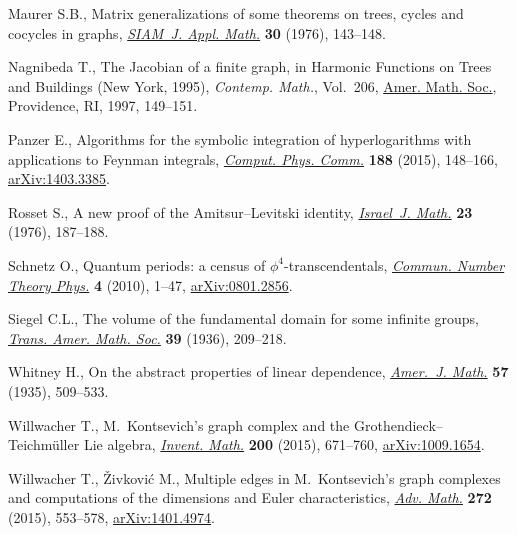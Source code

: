 \documentclass[pdftex]{sigma}%
\numberwithin{equation}{section}
\newcommand{\0}{\color{blue}{\mathsf{0}}}
\begin{document}
\begin{thebibliography}{99}
Maurer S.B., Matrix generalizations of some theorems on trees, cycles and
 cocycles in graphs, \href{https://doi.org/10.1137/0130017}{\textit{SIAM~J. Appl. Math.}} \textbf{30} (1976),
 143--148.

Nagnibeda T., The {J}acobian of a finite graph, in Harmonic Functions on Trees
 and Buildings ({N}ew {Y}ork, 1995), \textit{Contemp. Math.}, Vol.~206, \href{https://doi.org/10.1090/conm/206/02698}{Amer.
 Math. Soc.}, Providence, RI, 1997, 149--151.

Panzer E., Algorithms for the symbolic integration of hyperlogarithms with
 applications to {F}eynman integrals, \href{https://doi.org/10.1016/j.cpc.2014.10.019}{\textit{Comput. Phys. Comm.}}
 \textbf{188} (2015), 148--166, \href{https://arxiv.org/abs/1403.3385}{arXiv:1403.3385}.

Rosset S., A new proof of the {A}mitsur--{L}evitski identity, \href{https://doi.org/10.1007/BF02756797}{\textit{Israel~J.
 Math.}} \textbf{23} (1976), 187--188.

Schnetz O., Quantum periods: a census of {$\phi^4$}-transcendentals,
 \href{https://doi.org/10.4310/CNTP.2010.v4.n1.a1}{\textit{Commun. Number Theory Phys.}} \textbf{4} (2010), 1--47,
 \href{https://arxiv.org/abs/0801.2856}{arXiv:0801.2856}.

Siegel C.L., The volume of the fundamental domain for some infinite groups,
 \href{https://doi.org/10.2307/1989745}{\textit{Trans. Amer. Math. Soc.}} \textbf{39} (1936), 209--218.

Whitney H., On the abstract properties of linear dependence, \href{https://doi.org/10.2307/2371182}{\textit{Amer.~J.
 Math.}} \textbf{57} (1935), 509--533.

Willwacher T., M.~{K}ontsevich's graph complex and the
 {G}rothendieck--{T}eichm\"{u}ller {L}ie algebra, \href{https://doi.org/10.1007/s00222-014-0528-x}{\textit{Invent. Math.}}
 \textbf{200} (2015), 671--760, \href{https://arxiv.org/abs/1009.1654}{arXiv:1009.1654}.

Willwacher T., \v{Z}ivkovi\'{c} M., Multiple edges in {M}.~{K}ontsevich's graph
 complexes and computations of the dimensions and {E}uler characteristics,
 \href{https://doi.org/10.1016/j.aim.2014.12.010}{\textit{Adv. Math.}} \textbf{272} (2015), 553--578, \href{https://arxiv.org/abs/1401.4974}{arXiv:1401.4974}.

\end{thebibliography}\LastPageEnding
\end{document}
